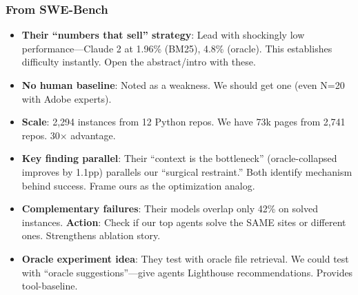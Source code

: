 \subsubsection{From SWE-Bench}
\begin{itemize}
    \item \textbf{Their ``numbers that sell'' strategy}: Lead with shockingly low performance---Claude 2 at 1.96\% (BM25), 4.8\% (oracle). This establishes difficulty instantly. Open the abstract/intro with these.
    \item \textbf{No human baseline}: Noted as a weakness. We should get one (even N=20 with Adobe experts).
    \item \textbf{Scale}: 2,294 instances from 12 Python repos. We have 73k pages from 2,741 repos. 30$\times$ advantage.
    \item \textbf{Key finding parallel}: Their ``context is the bottleneck'' (oracle-collapsed improves by 1.1pp) parallels our ``surgical restraint.'' Both identify mechanism behind success. Frame ours as the optimization analog.
    \item \textbf{Complementary failures}: Their models overlap only 42\% on solved instances. \textbf{Action}: Check if our top agents solve the SAME sites or different ones. Strengthens ablation story.
    \item \textbf{Oracle experiment idea}: They test with oracle file retrieval. We could test with ``oracle suggestions''---give agents Lighthouse recommendations. Provides tool-baseline.
\end{itemize}

